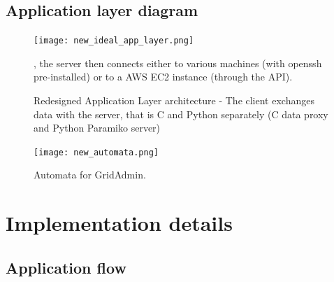 \documentclass{llncs}
\begin{document}
\subsection{Application layer diagram}


\begin{figure}[!ht]
\texttt{[image: new\_ideal\_app\_layer.png]}
\centering
\caption{Redesigned Application Layer architecture - The client exchanges data with the server, that is C and Python separately (C data proxy and Python Paramiko server)}, the server then connects either to various machines (with openssh pre-installed) or to a AWS EC2 instance (through the API).
\end{figure}


\begin{figure}[!ht]
\texttt{[image: new\_automata.png]}
\centering
\caption{Automata for GridAdmin.}
\end{figure}

\FloatBarrier
%
\section{Implementation details}
%

\subsection{Application flow}

\iffalse %
\end{document}
